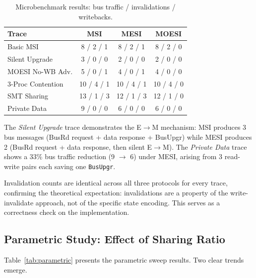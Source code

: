 \documentclass[10pt,twocolumn]{article}
\begin{document}
\begin{table}[h]
\centering
\caption{Microbenchmark results: bus traffic / invalidations / writebacks.}
\label{tab:results}
\small
\begin{tabular}{@{}lccc@{}}
\toprule
\textbf{Trace} & \textbf{MSI} & \textbf{MESI} & \textbf{MOESI} \\
\midrule
Basic MSI        & 8 / 2 / 1 & 8 / 2 / 1 & 8 / 2 / 0 \\
Silent Upgrade   & 3 / 0 / 0 & 2 / 0 / 0 & 2 / 0 / 0 \\
MOESI No-WB Adv. & 5 / 0 / 1 & 4 / 0 / 1 & 4 / 0 / 0 \\
3-Proc Contention & 10 / 4 / 1 & 10 / 4 / 1 & 10 / 4 / 0 \\
SMT Sharing      & 13 / 1 / 3 & 12 / 1 / 3 & 12 / 1 / 0 \\
Private Data     & 9 / 0 / 0 & 6 / 0 / 0 & 6 / 0 / 0 \\
\bottomrule
\end{tabular}
\end{table}

The \emph{Silent Upgrade} trace demonstrates the E$\to$M mechanism: MSI produces 3 bus messages (BusRd request + data response + BusUpgr) while MESI produces 2 (BusRd request + data response, then silent E$\to$M). The \emph{Private Data} trace shows a 33\% bus traffic reduction (9 $\to$ 6) under MESI, arising from 3 read-write pairs each saving one \texttt{BusUpgr}.

Invalidation counts are identical across all three protocols for every trace, confirming the theoretical expectation: invalidations are a property of the write-invalidate approach, not of the specific state encoding. This serves as a correctness check on the implementation.

\subsection{Parametric Study: Effect of Sharing Ratio}

Table~\ref{tab:parametric} presents the parametric sweep results. Two clear trends emerge.
\end{document}
